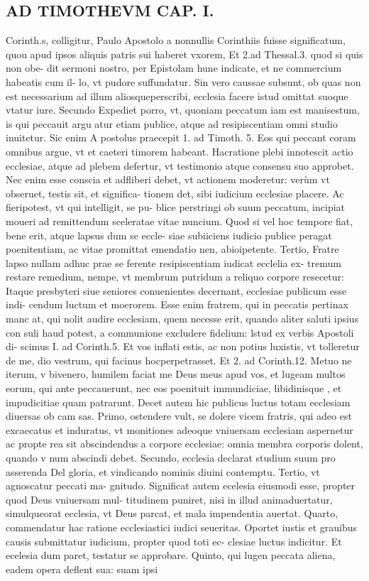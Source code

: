\documentclass{article}
\begin{document}
\begin{pages}
\section*{AD TIMOTHEVM CAP. I. }
\marginpar{[ p.71 ]}\pstart Corinth.s, colligitur, Paulo Apostolo a nonnullis Corinthiis fuisse significatum, quou apud ipsos aliquis patris sui haberet vxorem, Et 2.ad Thessal.3. quod si quis non obe- dit sermoni nostro, per Epistolam hune indicate, et ne commercium habeatis cum il- lo, vt pudore suffundatur. Sin vero caussae subsunt, ob quas non est necessarium ad illum aliosqueperscribi, ecclesia facere istud omittat suoque vtatur iure. Secundo Expediet porro, vt, quoniam peccatum iam est manisestum, is qui peccauit argu atur etiam publice, atque ad resipiscentiam omni studio inuitetur. Sic enim A postolus praecepit 1. ad Timoth. 5. Eos qui peccant coram omnibus argue, vt et caeteri timorem habeant. Hacratione plebi innotescit actio ecclesiae, atque ad plebem defertur, vt testimonio atque consensu suo approbet. Nec enim esse conscia et adfliberi debet, vt actionem moderetur: verùm vt obseruet, testis sit, et significa- tionem det, sibi iudicium ecclesiae placere. Ac fieripotest, vt qui intelligit, se pu- blice perstringi ob suum peccatum, incipiat moueri ad remittendum sceleratae vitae nuncium. Quod si vel hoc tempore fiat, bene erit, atque lapsus dum se eccle- siae subiiciens iudicio publice peragat poenitentiam, ac vitae promittat emendatio nen, abioipetente.  \pend\pstart Tertio, Fratre lapso nullam adhuc prae se ferente resipiscentiam iudicat ecclelia ex- tremum restare remedium, nempe, vt membrum putridum a reliquo corpore resecetur: Itaque  presbyteri siue seniores conuenientes decernant, ecclesiae publicum esse indi- cendum luctum et moerorem. Esse enim fratrem, qui in peccatis pertinax manc at, qui nolit audire ecclesiam, quem necesse erit, quando aliter saluti ipsius con suli haud potest, a communione excludere fidelium: lstud ex verbis Apostoli di- scimus I. ad Corinth.5. Et vos inflati estis, ac non potius luxistis, vt tolleretur de me, dio vestrum, qui facinus hocperpetrasset. Et 2. ad Corinth.12. Metuo ne iterum, v bivenero, humilem faciat me Deus meus apud vos, et lugeam multos eorum, qui ante peccauerunt, nec eos poenituit immundiciae, libidinisque , et impudicitiae quam patrarunt. Decet autem hic publicus luctus totam ecclesiam diuersas ob cam sas. Primo, ostendere vult, se dolere vicem fratris, qui adeo est excaecatus et induratus, vt monitiones adeoque vniuersam ecclesiam aspernetur ac propte rea sit abscindendus a corpore ecclesiae: omnia membra corporis dolent, quando v num abscindi debet. Secundo, ecclesia declarat studium suum pro asserenda Del gloria, et vindicando nominis diuini contemptu. Tertio, vt agnoscatur peccati ma- gnitudo. Significat autem ecelesia eiusmodi esse, propter quod Deus vniuersam mul- titudinem puniret, nisi in illud animaduertatur, simulqueorat ecclesia, vt Deus parcat, et mala impendentia auertat. Quarto, commendatur hac ratione ecclesiastici iudici seueritas. Oportet iustis et grauibus  causis submittatur iudicium, propter quod toti ec- clesiae luctus indicitur. Et ecelesia dum paret, testatur se approbare. Quinto, qui lugen peccata aliena, eadem opera deflent sua: suam ipsi 
\end{pages}
\end{document}
